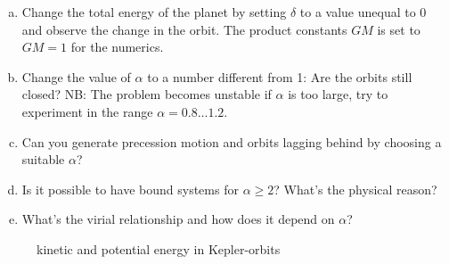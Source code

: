 \documentclass[a4paper,12pt]{article}
\begin{document}
\begin{enumerate}
\begin{enumerate}[(a)]
\item{Change the total energy of the planet by setting $\delta$ to a value unequal to 0 and observe the change in the orbit. The product constants $GM$ is set to $GM=1$ for the numerics.}
\item{Change the value of $\alpha$ to a number different from 1: Are the orbits still closed? NB: The problem becomes unstable if $\alpha$ is too large, try to experiment in the range $\alpha=0.8\ldots1.2$.}
\item{Can you generate precession motion and orbits lagging behind by choosing a suitable $\alpha$?}
\item{Is it possible to have bound systems for $\alpha\geq 2$? What's the physical reason?}
\item{What's the virial relationship and how does it depend on $\alpha$?}
\end{enumerate}

\begin{figure}[h]
\begin{center}
\caption{kinetic and potential energy in Kepler-orbits}
\end{center}
\end{figure}


\end{enumerate}
\end{document}
